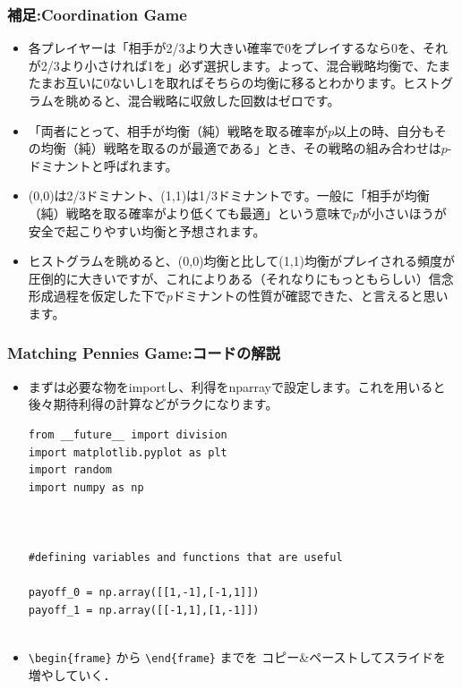 \documentclass[dvipdfmx,fleqn]{beamer}
\begin{document}
\begin{frame}
\frametitle{補足:Coordination Game}
\begin{itemize}\setlength{\parskip}{0.5em}
\item
各プレイヤーは「相手が2/3より大きい確率で0をプレイするなら0を、それが2/3より小さければ1を」必ず選択します。よって、混合戦略均衡で、たまたまお互いに0ないし1を取ればそちらの均衡に移るとわかります。ヒストグラムを眺めると、混合戦略に収斂した回数はゼロです。 \pause
\item
「両者にとって、相手が均衡（純）戦略を取る確率が$p$以上の時、自分もその均衡（純）戦略を取るのが最適である」とき、その戦略の組み合わせは$p$-ドミナントと呼ばれます。\pause
\item
(0,0)は2/3ドミナント、(1,1)は1/3ドミナントです。一般に「相手が均衡（純）戦略を取る確率がより低くても最適」という意味で$p$が小さいほうが安全で起こりやすい均衡と予想されます。\pause
\item
ヒストグラムを眺めると、(0,0)均衡と比して(1,1)均衡がプレイされる頻度が圧倒的に大きいですが、これによりある（それなりにもっともらしい）信念形成過程を仮定した下で$p$ドミナントの性質が確認できた、と言えると思います。

\end{itemize}
\end{frame}




\begin{frame}[containsverbatim]%
\frametitle{Matching Pennies Game:コードの解説}
\begin{itemize}\setlength{\parskip}{0.5em}
\item
まずは必要な物をimportし、利得をnparrayで設定します。これを用いると後々期待利得の計算などがラクになります。
\begin{verbatim}
from __future__ import division
import matplotlib.pyplot as plt
import random 
import numpy as np



#defining variables and functions that are useful

payoff_0 = np.array([[1,-1],[-1,1]])
payoff_1 = np.array([[-1,1],[1,-1]])


\end{verbatim}

\item
\verb|\begin{frame}| から \verb|\end{frame}| までを
コピー\&ペーストしてスライドを増やしていく．
\end{itemize}
\end{frame}
\end{document}
